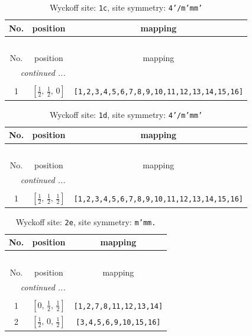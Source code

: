 \documentclass[fleqn,8pt]{jsarticle}
\begin{document}
\begin{longtable}{ccc}
\caption{Wyckoff site: {\tt 1c}, site symmetry: {\tt 4'/m'mm'}}
 \\
 \hline \hline
No. & position & mapping \\ \hline \endfirsthead

\multicolumn{2}{l}{\tablename\ \thetable{}} \\
 \hline \hline
No. & position & mapping \\ \hline \endhead

 \hline \hline
\multicolumn{2}{r}{\footnotesize\it continued ...} \\ \endfoot

 \hline \hline
\multicolumn{2}{r}{} \\ \endlastfoot

1 & $\left[ \frac{1}{2},\, \frac{1}{2},\, 0 \right]$ & {\tt [1,2,3,4,5,6,7,8,9,10,11,12,13,14,15,16]} \\
\end{longtable}
\renewcommand{\arraystretch}{1.2}
\begin{longtable}{ccc}
\caption{Wyckoff site: {\tt 1d}, site symmetry: {\tt 4'/m'mm'}}
 \\
 \hline \hline
No. & position & mapping \\ \hline \endfirsthead

\multicolumn{2}{l}{\tablename\ \thetable{}} \\
 \hline \hline
No. & position & mapping \\ \hline \endhead

 \hline \hline
\multicolumn{2}{r}{\footnotesize\it continued ...} \\ \endfoot

 \hline \hline
\multicolumn{2}{r}{} \\ \endlastfoot

1 & $\left[ \frac{1}{2},\, \frac{1}{2},\, \frac{1}{2} \right]$ & {\tt [1,2,3,4,5,6,7,8,9,10,11,12,13,14,15,16]} \\
\end{longtable}
\renewcommand{\arraystretch}{1.2}
\begin{longtable}{ccc}
\caption{Wyckoff site: {\tt 2e}, site symmetry: {\tt m'mm.}}
 \\
 \hline \hline
No. & position & mapping \\ \hline \endfirsthead

\multicolumn{2}{l}{\tablename\ \thetable{}} \\
 \hline \hline
No. & position & mapping \\ \hline \endhead

 \hline \hline
\multicolumn{2}{r}{\footnotesize\it continued ...} \\ \endfoot

 \hline \hline
\multicolumn{2}{r}{} \\ \endlastfoot

1 & $\left[ 0,\, \frac{1}{2},\, \frac{1}{2} \right]$ & {\tt [1,2,7,8,11,12,13,14]} \\ \hline
2 & $\left[ \frac{1}{2},\, 0,\, \frac{1}{2} \right]$ & {\tt [3,4,5,6,9,10,15,16]} \\
\end{longtable}
\end{document}
